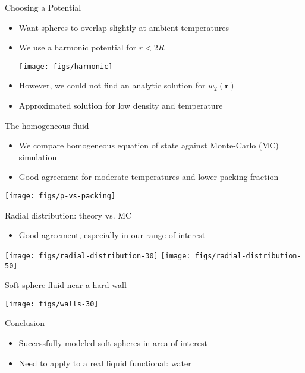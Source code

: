 \documentclass{beamer}
\newcommand{\rr}{\textbf{r}}
\begin{document}
\begin{frame}{Choosing a Potential}
 \begin{itemize}
   \item Want spheres to overlap slightly at ambient temperatures
   \item We use a harmonic potential for $r < 2R$
     \begin{center}
       \texttt{[image: figs/harmonic]}
     \end{center}
   \item However, we could not find an analytic solution for $w_2(\rr)$
   \item Approximated solution for low density and temperature
 \end{itemize}
\end{frame}

\begin{frame}{The homogeneous fluid}
  \begin{itemize}
    \item We compare homogeneous equation of state against Monte-Carlo
      (MC) simulation
    \item Good agreement for moderate temperatures and lower
      packing fraction
  \end{itemize}
  \begin{center}
    \texttt{[image: figs/p-vs-packing]}
  \end{center}
\end{frame}

\begin{frame}{Radial distribution: theory vs. MC}
  \begin{itemize}
  \item Good agreement, especially in our range of interest
  \end{itemize}
  \begin{center}
    \texttt{[image: figs/radial-distribution-30]}
    \texttt{[image: figs/radial-distribution-50]}
  \end{center}
\end{frame}

\begin{frame}{Soft-sphere fluid near a hard wall}
  \begin{center}
    \texttt{[image: figs/walls-30]}
  \end{center}
\end{frame}

\begin{frame}{Conclusion}
  \begin{itemize}
    \item Successfully modeled soft-spheres in area of interest
    \item Need to apply to a real liquid functional: water
  \end{itemize}
\end{frame}
\end{document}
